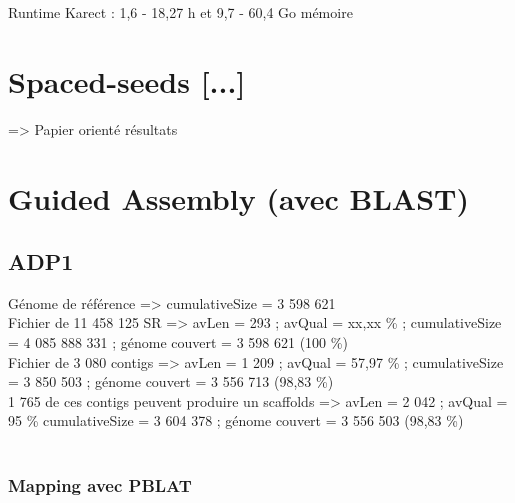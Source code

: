 \documentclass[12pt]{article}
\begin{document}
Runtime Karect : 1,6 - 18,27 h et 9,7 - 60,4 Go mémoire

\section{Spaced-seeds [...]}

=> Papier orienté résultats

\newpage
\section{Guided Assembly (avec BLAST)}


\subsection{ADP1}

Génome de référence => cumulativeSize = 3 598 621 \\

Fichier de 11 458 125 SR => avLen = 293 ; avQual = xx,xx \% ; cumulativeSize = 4 085 888 331 ; génome couvert = 3 598 621 (100 \%) \\

Fichier de 3 080 contigs => avLen = 1 209 ; avQual = 57,97 \% ; cumulativeSize = 3 850 503 ; génome couvert = 3 556 713 (98,83 \%) \\

1 765 de ces contigs peuvent produire un scaffolds => avLen = 2 042 ; avQual = 95 \% cumulativeSize = 3 604 378 ; 
génome  couvert = 3 556 503 (98,83 \%) \\ \\

\subsubsection{Mapping avec PBLAT}
\end{document}
